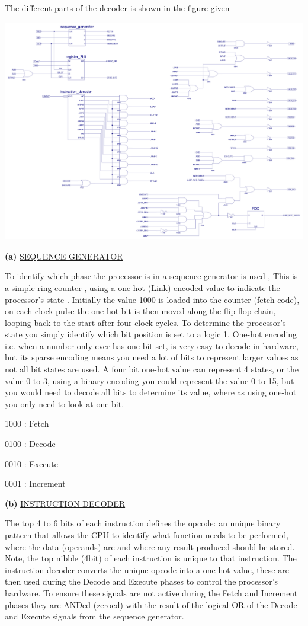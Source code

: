 \documentclass[11pt]{article}
\begin{document}
The different parts of the decoder is shown in the figure given
\begin{center}
\includegraphics[width=.9\linewidth]{./images/decoder.jpg}
\end{center}


\textbf{(a)} \uline{SEQUENCE GENERATOR}

To identify which phase the processor is in a sequence generator is used , This is a simple ring counter , using a one-hot (Link) encoded value to indicate the processor's state .
Initially the value 1000 is loaded into the counter (fetch code), on each clock pulse the one-hot bit is then moved along the flip-flop chain, looping back to the start after four clock cycles. To determine the processor's state you simply identify which bit position is set to a logic 1. One-hot encoding i.e. when a number only ever has one bit set, is very easy to decode in hardware, but its sparse encoding means you need a lot of bits to represent larger values as not all bit states are used. A four bit one-hot value can represent 4 states, or the value 0 to 3, using a binary encoding you could represent the value 0 to 15, but you would need to decode all bits to determine its value, where as using one-hot you only need to look at one bit.

1000 : Fetch

0100 : Decode

0010 : Execute

0001 : Increment

\textbf{(b)} \uline{INSTRUCTION DECODER}

The top 4 to 6 bits of each instruction defines the opcode: an unique binary pattern that allows the CPU to identify what function needs to be performed, where the data (operands) are and where any result produced should be stored. Note, the top nibble (4bit) of each instruction is unique to that instruction. The instruction decoder  converts the unique opcode into a one-hot value, these are then used during the Decode and Execute phases to control the processor's hardware. To ensure these signals are not active during the Fetch and Increment phases they are ANDed (zeroed) with the result of the logical OR of the Decode and Execute signals from the sequence generator. \\
\end{document}
